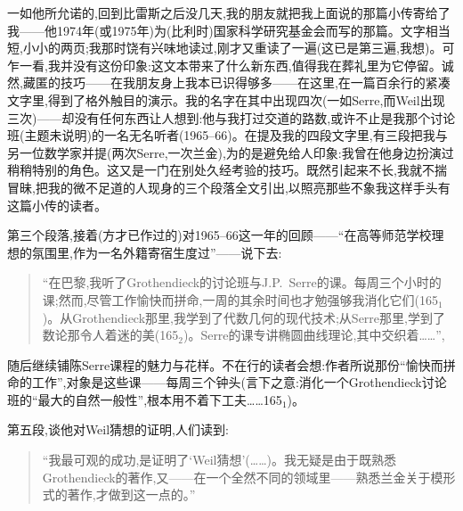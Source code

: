 一如他所允诺的,回到比雷斯之后没几天,我的朋友就把我上面说的那篇小传\dmark{}寄给了我——他1974年(或1975年)为(比利时)国家科学研究基金会而写的那篇。文字相当短,小小的两页;我那时饶有兴味地读过,刚才又重读了一遍(这已是第三遍,我想)。可乍一看,我并没有这份印象:这文本带来了什么新东西,值得我在葬礼里为它停留。诚然,藏匿的技巧——在我朋友身上我本已识得够多——在这里,在一篇百余行的紧凑文字里,得到了格外触目的演示。我的名字在其中出现四次(一如Serre,而Weil出现三次)——却没有任何东西让人想到:他与我打过交道的路数,或许不止是我那个讨论班(主题未说明)的一名无名听者(1965--66)。在提及我的四段文字里,有三段把我与另一位数学家并提(两次Serre,一次兰金),为的是避免给人印象:我曾在他身边扮演过稍稍特别的角色。这又是一门在别处久经考验的技巧。既然引起来不长,我就不揣冒昧,把我的微不足道的人现身的三个段落全文引出,以照亮那些不象我这样手头有这篇小传的读者。

第三个段落,接着(方才已作过的)对1965--66这一年的回顾——“在高等师范学校理想的氛围里,作为一名外籍寄宿生度过”——说下去:

\begin{quote}
“在巴黎,我听了Grothendieck的讨论班与J.P.~Serre的课。每周三个小时的课\dmark{};然而,尽管工作愉快而拼命,一周的其余时间也才勉强够我消化它们(165$_{1}$)。从Grothendieck那里,我学到了代数几何的现代技术;从Serre那里,学到了数论那令人着迷的美(165$_{2}$)。Serre的课专讲椭圆曲线理论,其中交织着……”,\end{quote}

随后继续铺陈Serre课程的魅力与花样。不在行的读者会想:作者所说那份“愉快而拼命的工作”,对象是这些课——每周三个钟头(言下之意:消化一个Grothendieck讨论班的“最大的自然一般性”,根本用不着下工夫……165$_{1}$)。

第五段,谈他对Weil猜想的证明,人们读到:

\begin{quote}
“我最可观的成功,是证明了‘Weil猜想’(……)。我无疑是由于既熟悉Grothendieck的著作,又——在一个全然不同的领域里——熟悉兰金关于模形式的著作,才做到这一点的。”
\end{quote}

